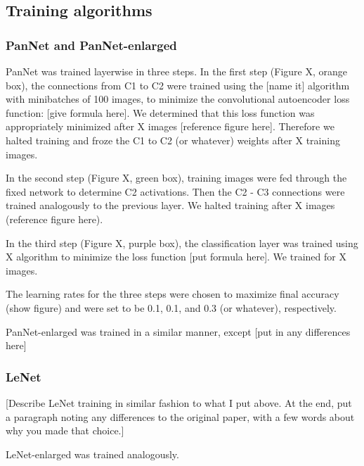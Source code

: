 \subsection{Training algorithms}


\subsubsection{PanNet and PanNet-enlarged}

PanNet was trained layerwise in three steps. In the first step (Figure X, orange box), the connections from C1 to C2 were trained using the [name it] algorithm with minibatches of 100 images, to minimize the convolutional autoencoder loss function: [give formula here]. We determined that this loss function was appropriately minimized after X images [reference figure here]. Therefore we halted training and froze the C1 to C2 (or whatever) weights after X training images.

In the second step (Figure X, green box), training images were fed through the fixed network to determine C2 activations. Then the C2 - C3 connections were trained analogously to the previous layer. We halted training after X images (reference figure here).

In the third step (Figure X, purple box), the classification layer was trained using X algorithm to minimize the loss function [put formula here]. We trained for X images.

The learning rates for the three steps were chosen to maximize final accuracy (show figure) and were set to be 0.1, 0.1, and 0.3 (or whatever), respectively.

PanNet-enlarged was trained in a similar manner, except [put in any differences here]


\subsubsection{LeNet}

[Describe LeNet training in similar fashion to what I put above. At the end, put a paragraph noting any differences to the original paper, with a few words about why you made that choice.]

LeNet-enlarged was trained analogously.

